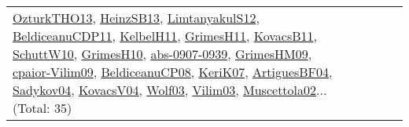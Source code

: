 {\begin{longtable}{lp{3cm}>{\raggedright}p{6cm}>{\raggedright}p{6cm}p{8cm}}
\href{articles/OzturkTHO13.pdf}{OzturkTHO13}\cite{OzturkTHO13}, \href{articles/HeinzSB13.pdf}{HeinzSB13}\cite{HeinzSB13}, \href{articles/LimtanyakulS12.pdf}{LimtanyakulS12}\cite{LimtanyakulS12}, \href{articles/BeldiceanuCDP11.pdf}{BeldiceanuCDP11}\cite{BeldiceanuCDP11}, \href{articles/KelbelH11.pdf}{KelbelH11}\cite{KelbelH11}, \href{papers/GrimesH11.pdf}{GrimesH11}\cite{GrimesH11}, \href{articles/KovacsB11.pdf}{KovacsB11}\cite{KovacsB11}, \href{papers/SchuttW10.pdf}{SchuttW10}\cite{SchuttW10}, \href{papers/GrimesH10.pdf}{GrimesH10}\cite{GrimesH10}, \href{articles/abs-0907-0939.pdf}{abs-0907-0939}\cite{abs-0907-0939}, \href{papers/GrimesHM09.pdf}{GrimesHM09}\cite{GrimesHM09}, \href{papers/cpaior-Vilim09.pdf}{cpaior-Vilim09}\cite{cpaior-Vilim09}, \href{papers/BeldiceanuCP08.pdf}{BeldiceanuCP08}\cite{BeldiceanuCP08}, \href{papers/KeriK07.pdf}{KeriK07}\cite{KeriK07}, \href{papers/ArtiguesBF04.pdf}{ArtiguesBF04}\cite{ArtiguesBF04}, \href{papers/Sadykov04.pdf}{Sadykov04}\cite{Sadykov04}, \href{papers/KovacsV04.pdf}{KovacsV04}\cite{KovacsV04}, \href{papers/Wolf03.pdf}{Wolf03}\cite{Wolf03}, \href{papers/Vilim03.pdf}{Vilim03}\cite{Vilim03}, \href{papers/Muscettola02.pdf}{Muscettola02}\cite{Muscettola02}... (Total: 35)\\

\end{longtable}}
